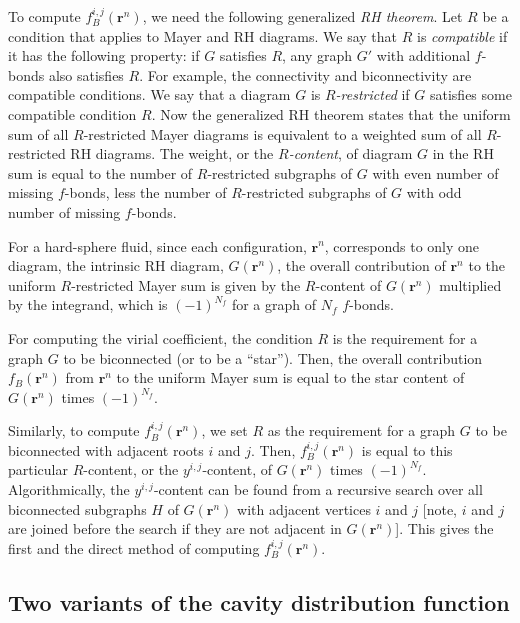 \documentclass[aip,jcp,preprint,superscriptaddress,showpacs,preprintnumbers,amsmath,amssymb]{revtex4-1}
\numberwithin{equation}{section}
\newcommand{\vct}[1]{\mathbf{#1}}
\providecommand{\vr}{} %
\renewcommand{\vr}{\vct{r}}
\begin{document}
To compute $f_B^{i,j}(\vr^n)$,
we need the following generalized
\emph{RH theorem}.
%
Let $R$ be a condition that applies to Mayer and RH diagrams.
%
We say that $R$ is \emph{compatible}
if it has the following property:
if $G$ satisfies $R$,
any graph $G'$ with additional $f$-bonds
also satisfies $R$.
%
For example,
the connectivity and biconnectivity
are compatible conditions.
%
We say that a diagram $G$ is \emph{$R$-restricted}
if $G$ satisfies some compatible condition $R$.
%
Now the generalized RH theorem states that
the uniform sum of all $R$-restricted Mayer diagrams
is equivalent to a weighted sum of
all $R$-restricted RH diagrams.
%
The weight, or the \emph{$R$-content},
of diagram $G$ in the RH sum is equal to
the number of $R$-restricted subgraphs of $G$
with even number of missing $f$-bonds,
less the number of $R$-restricted subgraphs of $G$
with odd number of missing $f$-bonds.



For a hard-sphere fluid,
since each configuration, $\vr^n$,
corresponds to only one diagram,
the intrinsic RH diagram, $G(\vr^n)$,
the overall contribution of $\vr^n$
to the uniform $R$-restricted Mayer sum
is given by the $R$-content of $G(\vr^n)$
multiplied by the integrand,
which is $(-1)^{N_f}$ for a graph of $N_f$ $f$-bonds.



For computing the virial coefficient,
the condition $R$ is the requirement for a graph $G$
to be biconnected (or to be a ``star'').
%
Then, the overall contribution $f_B(\vr^n)$ from $\vr^n$
to the uniform Mayer sum is equal to
the star content of $G(\vr^n)$ times $(-1)^{N_f}$.



Similarly,
to compute $f_B^{i,j}(\vr^n)$,
we set $R$ as the requirement for a graph $G$ to be biconnected
with adjacent roots $i$ and $j$.
%
Then,
$f_B^{i,j}(\vr^n)$
is equal to this particular $R$-content,
or the $y^{i,j}$-content,
of $G(\vr^n)$ times $(-1)^{N_f}$.
%
Algorithmically,
the $y^{i,j}$-content can be found
from a recursive search over all biconnected subgraphs $H$
of $G(\vr^n)$ with adjacent vertices $i$ and $j$
[note, $i$ and $j$ are joined before the search
if they are not adjacent in $G(\vr^n)$].
%
This gives the first and the direct method of
computing $f_B^{i,j}(\vr^n)$.





\subsection{Two variants of the cavity distribution function}
\end{document}
